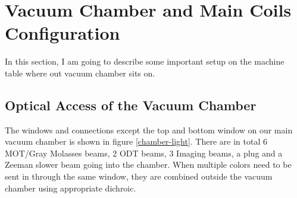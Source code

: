 \section{Vacuum Chamber and Main Coils Configuration}\label{exp:machine-table}

In this section, I am going to describe some important setup on the machine table where out vacuum chamber sits on.

\subsection{Optical Access of the Vacuum Chamber}\label{exp:chamber}
The windows and connections except the top and bottom window on our main vacuum chamber is shown in figure \ref{chamber-light}. There are in total $6$ MOT/Gray Molasses beams, $2$ ODT beams, $3$ Imaging beams, a plug and a Zeeman slower beam going into the chamber. When multiple colors need to be sent in through the same window, they are combined outside the vacuum chamber using appropriate dichroic.
